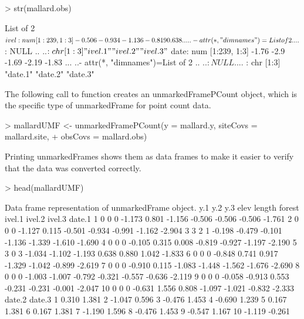\documentclass[article,shortnames]{jss}
\begin{document}
\begin{Schunk}
\begin{Sinput}
> str(mallard.obs)
\end{Sinput}
\begin{Soutput}
List of 2
 $ ivel: num [1:239, 1:3] -0.506 -0.934 -1.136 -0.819 0.638 ...
  ..- attr(*, "dimnames")=List of 2
  .. ..$ : NULL
  .. ..$ : chr [1:3] "ivel.1" "ivel.2" "ivel.3"
 $ date: num [1:239, 1:3] -1.76 -2.9 -1.69 -2.19 -1.83 ...
  ..- attr(*, "dimnames")=List of 2
  .. ..$ : NULL
  .. ..$ : chr [1:3] "date.1" "date.2" "date.3"
\end{Soutput}
\end{Schunk}

The following call to  function creates an
unmarkedFramePCount object, which is the specific type of
unmarkedFrame for point count data.

\begin{Schunk}
\begin{Sinput}
> mallardUMF <- unmarkedFramePCount(y = mallard.y, siteCovs = mallard.site, 
+     obsCovs = mallard.obs)
\end{Sinput}
\end{Schunk}

Printing unmarkedFrames shows them as data frames to make it easier to
verify that the data was converted correctly.

\begin{Schunk}
\begin{Sinput}
> head(mallardUMF)
\end{Sinput}
\begin{Soutput}
Data frame representation of unmarkedFrame object.
   y.1 y.2 y.3   elev length forest ivel.1 ivel.2 ivel.3 date.1
1    0   0   0 -1.173  0.801 -1.156 -0.506 -0.506 -0.506 -1.761
2    0   0   0 -1.127  0.115 -0.501 -0.934 -0.991 -1.162 -2.904
3    3   2   1 -0.198 -0.479 -0.101 -1.136 -1.339 -1.610 -1.690
4    0   0   0 -0.105  0.315  0.008 -0.819 -0.927 -1.197 -2.190
5    3   0   3 -1.034 -1.102 -1.193  0.638  0.880  1.042 -1.833
6    0   0   0 -0.848  0.741  0.917 -1.329 -1.042 -0.899 -2.619
7    0   0   0 -0.910  0.115 -1.083 -1.448 -1.562 -1.676 -2.690
8    0   0   0 -1.003 -1.007 -0.792 -0.321 -0.557 -0.636 -2.119
9    0   0   0 -0.058 -0.913  0.553 -0.231 -0.231 -0.001 -2.047
10   0   0   0 -0.631  1.556  0.808 -1.097 -1.021 -0.832 -2.333
   date.2 date.3
1   0.310  1.381
2  -1.047  0.596
3  -0.476  1.453
4  -0.690  1.239
5   0.167  1.381
6   0.167  1.381
7  -1.190  1.596
8  -0.476  1.453
9  -0.547  1.167
10 -1.119 -0.261
\end{Soutput}
\end{Schunk}
\end{document}
